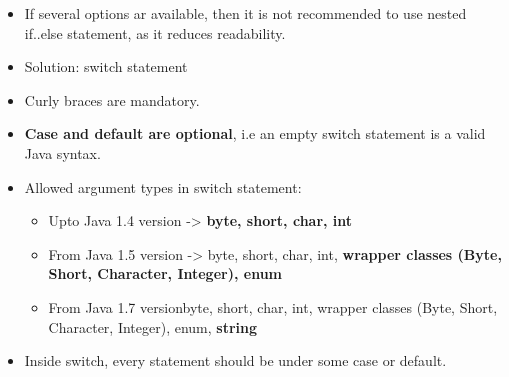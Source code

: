 \setlength{\columnsep}{3pt}
\begin{flushleft}
	
	\begin{itemize}
		\item If several options ar available, then it is not recommended to use nested if..else statement, as it reduces readability.
		
		\item Solution: switch statement
		\bigskip
		\newpage
		\item Curly braces are mandatory.
		\item \textbf{Case and default are optional}, i.e an empty switch statement is a valid Java syntax.
		\bigskip
		\item Allowed argument types in switch statement:
		\begin{itemize}
			\item Upto Java 1.4 version -> \textbf{byte, short, char, int}
			\item From Java 1.5 version -> byte, short, char, int, \textbf{wrapper classes (Byte, Short, Character, Integer), enum}
			\item From Java 1.7 versionbyte, short, char, int, wrapper classes (Byte, Short, Character, Integer), enum, \textbf{string}
		\end{itemize}
		
		\bigskip	
		\item Inside switch, every statement should be under some case or default.
		
		

\end{itemize}
\end{flushleft}
